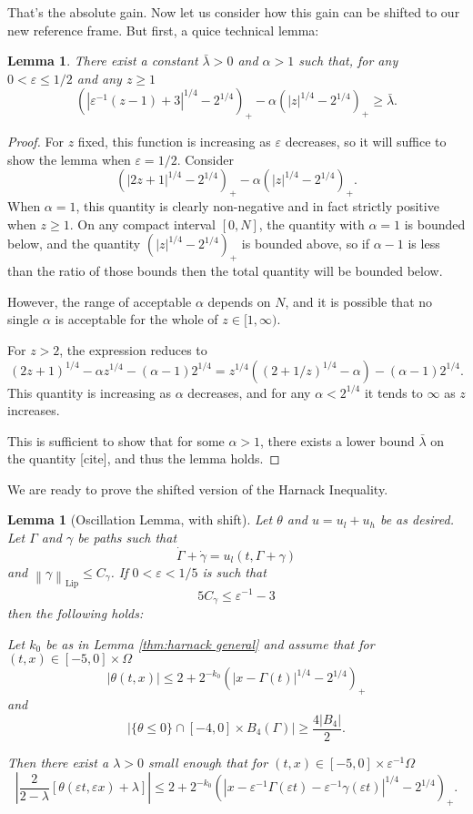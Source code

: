 \documentclass[11pt]{amsart}
\newtheorem{lemma}[theorem]{Lemma}
\theoremstyle{remark}
\theoremstyle{definition}
\newcommand{\eps}{\varepsilon}
\newcommand{\norm}[1]{\left\lVert#1\right\rVert}
\newcommand{\paren}[1]{\left( #1 \right)}
\newcommand{\bracket}[1]{\left[ #1 \right]}
\newcommand{\abs}[1]{\left\lvert #1 \right\rvert}
\newcommand{\Lip}{\text{Lip}}
\newcommand{\n}{^{-1}}
\newcommand{\ulow}{u_l}
\newcommand{\uhigh}{u_h}
\begin{document}
That's the absolute gain.  Now let us consider how this gain can be shifted to our new reference frame.  But first, a quice technical lemma:

\begin{lemma} \label{thm:technical scaling of barrier}
There exist a constant $\bar{\lambda} > 0$ and $\alpha > 1$ such that, for any $0 < \eps \leq 1/2$ and any $z \geq 1$
\[ \paren{|\eps\n (z - 1) + 3|^{1/4} - 2^{1/4}}_+ - \alpha \paren{|z|^{1/4} - 2^{1/4}}_+ \geq \bar{\lambda}. \]
\end{lemma}

\begin{proof}
For $z$ fixed, this function is increasing as $\eps$ decreases, so it will suffice to show the lemma when $\eps = 1/2$.  Consider
\[ \paren{|2 z + 1|^{1/4} - 2^{1/4}}_+ - \alpha \paren{|z|^{1/4} - 2^{1/4}}_+. \]
When $\alpha = 1$, this quantity is clearly non-negative and in fact strictly positive when $z \geq 1$.  On any compact interval $[0,N]$, the quantity with $\alpha = 1$ is bounded below, and the quantity $\paren{|z|^{1/4} - 2^{1/4}}_+$ is bounded above, so if $\alpha-1$ is less than the ratio of those bounds then the total quantity will be bounded below.  

However, the range of acceptable $\alpha$ depends on $N$, and it is possible that no single $\alpha$ is acceptable for the whole of $z \in [1,\infty)$.  

For $z > 2$, the expression reduces to
\[ (2z+1)^{1/4} - \alpha z^{1/4} - (\alpha-1) 2^{1/4} = z^{1/4} \paren{(2 + 1/z)^{1/4} - \alpha} - (\alpha-1)2^{1/4}. \]
This quantity is increasing as $\alpha$ decreases, and for any $\alpha < 2^{1/4}$ it tends to $\infty$ as $z$ increases. 

This is sufficient to show that for some $\alpha > 1$, there exists a lower bound $\bar{\lambda}$ on the quantity [cite], and thus the lemma holds. 
\end{proof}

We are ready to prove the shifted version of the Harnack Inequality.  

\begin{lemma}[Oscillation Lemma, with shift] \label{thm:oscillation shifted}
Let $\theta$ and $u = \ulow + \uhigh$ be as desired.  Let $\Gamma$ and $\gamma$ be paths such that
\[ \dot{\Gamma} + \dot{\gamma} = \ulow(t,\Gamma+\gamma) \]
and $\norm{\gamma}_\Lip \leq C_\gamma$.  If $0 < \eps < 1/5$ is such that
\[ 5 C_\gamma \leq \eps\n - 3 \]
then the following holds:

Let $k_0$ be as in Lemma \ref{thm:harnack general} and assume that for $(t,x) \in [-5,0]\times \Omega$
\[ |\theta(t,x)| \leq 2 + 2^{-k_0} \paren{|x-\Gamma(t)|^{1/4}-2^{1/4}}_+ \]
and
\[ \abs{\{\theta \leq 0\} \cap [-4,0]\times B_4(\Gamma)} \geq \frac{4|B_4|}{2}. \]

Then there exist a $\lambda > 0$ small enough that for $(t,x) \in [-5,0]\times \eps\n \Omega$
\[ \abs{\frac{2}{2-\lambda} \bracket{\theta(\eps t, \eps x) + \lambda}} \leq 2 + 2^{-k_0} \paren{|x-\eps\n\Gamma(\eps t)-\eps\n\gamma(\eps t)|^{1/4}-2^{1/4}}_+. \]
\end{lemma}
\end{document}
